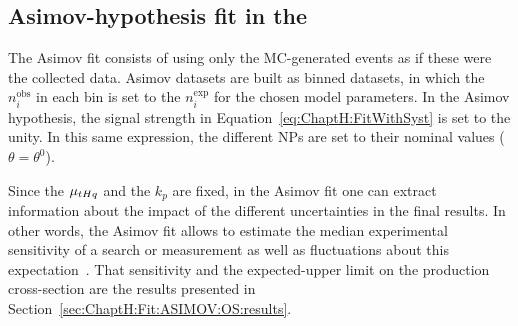 \FloatBarrier
\subsection{Asimov-hypothesis fit in the \dilepOStau}
\label{sec:ChaptH:Fit:ASIMOV:OS}
The Asimov fit consists of using only the MC-generated events as if these were the collected data. 
Asimov datasets are built as binned datasets, in which the $n_{i}^{\text{obs}}$
in each bin is set to the $n_{i}^{\text{exp}}$ for the chosen model parameters.
In the Asimov hypothesis, the signal strength in Equation~\ref{eq:ChaptH:FitWithSyst} is set to the unity. 
In this same expression, the different NPs are set to their nominal values ($\theta = \theta^{0}$).

Since the $\mu_{tHq}$ and the $k_p$ are fixed, in the Asimov fit one can extract 
information about the impact of the different uncertainties in the final results. In other
words, the Asimov fit allows to estimate the median experimental sensitivity of  
a search or measurement as well as fluctuations about this expectation~\cite{Cowan:2010js}. 
That sensitivity and the expected-upper limit on the production cross-section are
the results presented in Section~\ref{sec:ChaptH:Fit:ASIMOV:OS:results}.










